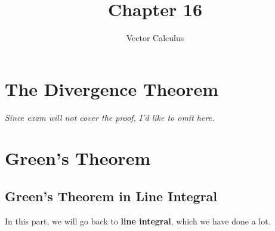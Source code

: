 \documentclass[11pt, a4paper]{MATH2023}
\title{Chapter 16}
\subtitle{Vector Calculus}
\begin{document}
\begin{spacing}{1.3}

    \section{The Divergence Theorem}


    \vspace{0.3in}
    {\it Since exam will not cover the proof, I'd like to omit here.}



    \newpage
    \section{Green's Theorem}
    \subsection{Green's Theorem in Line Integral}

    {\blue In this part, we will go back to {\bf line integral}, which we have done a lot.}


\end{spacing}
\end{document}
